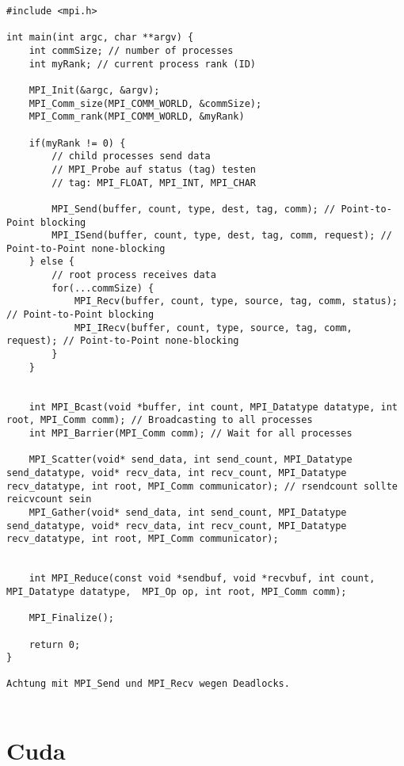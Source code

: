 \documentclass{article}
\begin{document}
\begin{multicols}{2}
\begin{listing}[H]
\begin{verbatim}
#include <mpi.h>

int main(int argc, char **argv) {
    int commSize; // number of processes
    int myRank; // current process rank (ID)

    MPI_Init(&argc, &argv);
    MPI_Comm_size(MPI_COMM_WORLD, &commSize);
    MPI_Comm_rank(MPI_COMM_WORLD, &myRank)
    
    if(myRank != 0) {
        // child processes send data
        // MPI_Probe auf status (tag) testen
        // tag: MPI_FLOAT, MPI_INT, MPI_CHAR
        
        MPI_Send(buffer, count, type, dest, tag, comm); // Point-to-Point blocking
        MPI_ISend(buffer, count, type, dest, tag, comm, request); // Point-to-Point none-blocking
    } else {
        // root process receives data
        for(...commSize) {
            MPI_Recv(buffer, count, type, source, tag, comm, status); // Point-to-Point blocking
            MPI_IRecv(buffer, count, type, source, tag, comm, request); // Point-to-Point none-blocking
        }
    }
    
    
    int MPI_Bcast(void *buffer, int count, MPI_Datatype datatype, int root, MPI_Comm comm); // Broadcasting to all processes
    int MPI_Barrier(MPI_Comm comm); // Wait for all processes
    
    MPI_Scatter(void* send_data, int send_count, MPI_Datatype send_datatype, void* recv_data, int recv_count, MPI_Datatype recv_datatype, int root, MPI_Comm communicator); // rsendcount sollte reicvcount sein
    MPI_Gather(void* send_data, int send_count, MPI_Datatype send_datatype, void* recv_data, int recv_count, MPI_Datatype recv_datatype, int root, MPI_Comm communicator);
    
    
    int MPI_Reduce(const void *sendbuf, void *recvbuf, int count, MPI_Datatype datatype,  MPI_Op op, int root, MPI_Comm comm);
    
    MPI_Finalize();
    
    return 0;
}

Achtung mit MPI_Send und MPI_Recv wegen Deadlocks.


\end{verbatim}
\end{listing}

\section{Cuda}


\end{multicols}
\end{document}
